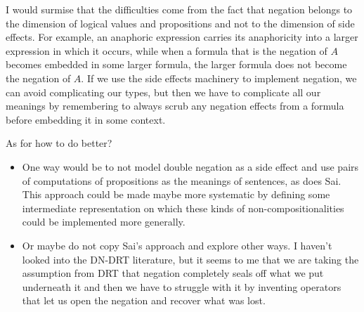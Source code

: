 \documentclass[a4paper,11pt,DIV=12]{scrartcl}
\begin{document}
I would surmise that the difficulties come from the fact that negation
belongs to the dimension of logical values and propositions and not to the
dimension of side effects. For example, an anaphoric expression carries its
anaphoricity into a larger expression in which it occurs, while when a
formula that is the negation of $A$ becomes embedded in some larger
formula, the larger formula does not become the negation of $A$. If we use
the side effects machinery to implement negation, we can avoid complicating
our types, but then we have to complicate all our meanings by remembering
to always scrub any negation effects from a formula before embedding it in
some context.

As for how to do better?

\begin{itemize}
\item One way would be to not model double negation as a side effect and
  use pairs of computations of propositions as the meanings of sentences,
  as does Sai. This approach could be made maybe more systematic by
  defining some intermediate representation on which these kinds of
  non-compositionalities could be implemented more generally.
\item Or maybe do not copy Sai's approach and explore other ways. I haven't
  looked into the DN-DRT literature, but it seems to me that we are taking
  the assumption from DRT that negation completely seals off what we put
  underneath it and then we have to struggle with it by inventing operators
  that let us open the negation and recover what was lost.
\end{itemize}
\end{document}
